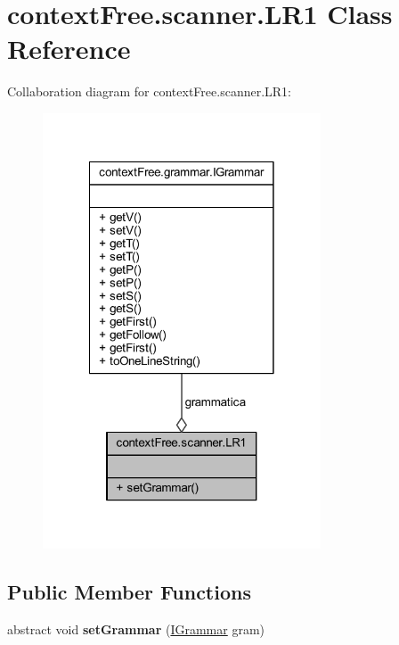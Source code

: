 \hypertarget{classcontext_free_1_1scanner_1_1_l_r1}{\section{context\-Free.\-scanner.\-L\-R1 Class Reference}
\label{classcontext_free_1_1scanner_1_1_l_r1}
}


Collaboration diagram for context\-Free.\-scanner.\-L\-R1\-:\nopagebreak
\begin{figure}[H]
\begin{center}
\leavevmode
\includegraphics[width=234pt]{classcontext_free_1_1scanner_1_1_l_r1__coll__graph}
\end{center}
\end{figure}
\subsection*{Public Member Functions}
\begin{DoxyCompactItemize}
\item 
\hypertarget{classcontext_free_1_1scanner_1_1_l_r1_a978dd61922779f34a285f30060bf4135}{abstract void {\bfseries set\-Grammar} (\hyperlink{interfacecontext_free_1_1grammar_1_1_i_grammar}{I\-Grammar} gram)}\label{classcontext_free_1_1scanner_1_1_l_r1_a978dd61922779f34a285f30060bf4135}

\end{DoxyCompactItemize}
